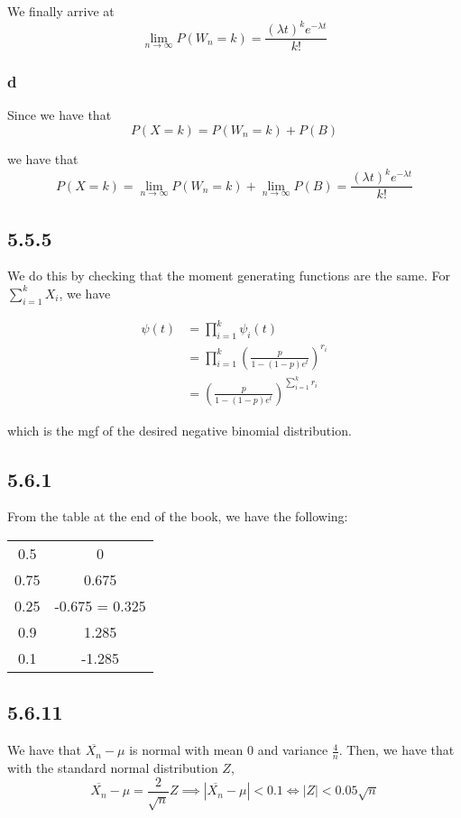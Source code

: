 \documentclass[12pt,letterpaper]{article}
\theoremstyle{definition}
\begin{document}
  We finally arrive at
  \[
    \lim_{n\rightarrow \infty}P(W_n = k) = \frac{(\lambda t)^ke^{-\lambda t}}{k!}
  \]

\subsubsection*{d}

Since we have that
\[
  P(X = k) = P(W_n = k) + P(B)
\]

we have that
\[
  P(X = k) = \lim_{n \rightarrow \infty}P(W_n = k) + \lim_{n \rightarrow
    \infty}P(B) = \frac{(\lambda t)^ke^{-\lambda t}}{k!}
\]

\subsection*{5.5.5}

We do this by checking that the moment generating functions are the same. For
$\sum_{i=1}^kX_i$, we have

\begin{align*}
  \psi(t) &= \prod_{i=1}^k\psi_i(t) \\
          &= \prod_{i=1}^k\left( \frac{p}{1 - (1-p)e^t} \right)^{r_i} \\
          &= \left( \frac{p}{1 - (1-p)e^t} \right)^{\sum_{i=1}^k r_i}
\end{align*}

which is the mgf of the desired negative binomial distribution.

\subsection*{5.6.1}

From the table at the end of the book, we have the following:
\begin{center}
  \begin{tabular}{c|c}
    0.5 & 0 \\
    0.75 & 0.675 \\
    0.25 & -0.675 = 0.325 \\
    0.9 & 1.285 \\
    0.1 & -1.285
  \end{tabular}
\end{center}

\subsection*{5.6.11}

We have that $\overline{X_n} - \mu$ is normal with mean $0$ and variance
$\frac{4}{n}$. Then, we have that with the standard normal distribution $Z$,
\[
  \overline{X_n} - \mu = \frac{2}{\sqrt{n}}Z \implies |\overline{X_n} - \mu| <
  0.1 \iff |Z| < 0.05\sqrt{n}
\]
\end{document}
